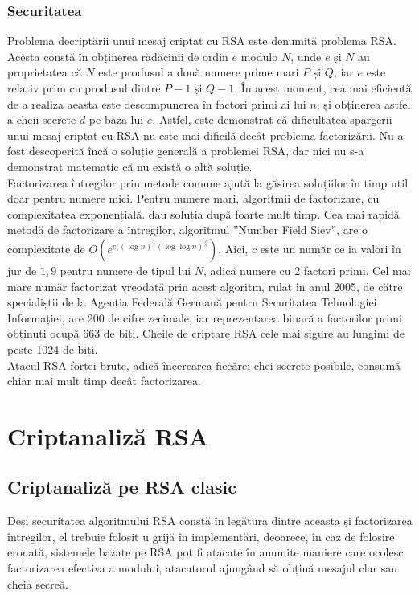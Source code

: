 \documentclass[12]{report}
\begin{document}
\subsection{Securitatea}
Problema decriptării unui mesaj criptat cu RSA este denumită problema RSA. Acesta constă în obținerea rădăcinii de ordin $e$ modulo $N$, unde $e$ și $N$ au proprietatea că $N$ este produsul a două numere prime mari $P$ și $Q$, iar $e$ este relativ prim cu produsul dintre $P-1$ și $Q-1$. În acest moment, cea mai eficientă de a realiza aeasta este descompunerea în factori primi ai lui $n$, și obținerea astfel a cheii secrete $d$ pe baza lui $e$. Astfel, este demonstrat că dificultatea spargerii unui mesaj criptat cu RSA nu este mai dificilă decât problema factorizării. Nu a fost descoperită încă o soluție generală a problemei RSA, dar nici nu s-a demonstrat matematic că nu există o altă soluție. \\
Factorizarea întregilor prin metode comune ajută la găsirea soluțiilor în timp util doar pentru numere mici. Pentru numere mari, algoritmii de factorizare, cu complexitatea exponențială. dau soluția după foarte mult timp. Cea mai rapidă metodă de factorizare a întregilor, algoritmul ”Number Field Siev”, are o complexitate de $O(e^{c((\log n)^{\frac{1}{3}} (\log \log n)^{\frac{2}{3}}       })$. Aici, $c$ este un număr ce ia valori în jur de $1,9$ pentru numere de tipul lui $N$, adică numere cu 2 factori primi. Cel mai mare număr factorizat vreodată prin acest algoritm, rulat în anul 2005, de către specialiștii de la Agenția Federală Germană pentru Securitatea Tehnologiei Informației, are 200 de cifre zecimale, iar reprezentarea binară a factorilor primi obținuți ocupă 663 de biți. Cheile de criptare RSA cele mai sigure au lungimi de peste 1024 de biți.\\
Atacul RSA forței brute, adică încercarea fiecărei chei secrete posibile, consumă chiar mai mult timp decât factorizarea.
\chapter{Criptanaliză RSA}
\section{Criptanaliză pe RSA clasic}
Deși securitatea algoritmului RSA constă în legătura dintre aceasta și factorizarea întregilor, el trebuie folosit u grijă în implementări, deoarece, în caz de folosire eronată, sistemele bazate pe RSA pot fi atacate în anumite maniere care ocolesc factorizarea efectiva a modului, atacatorul ajungând să obțină mesajul clar sau cheia secreă.
\end{document}
